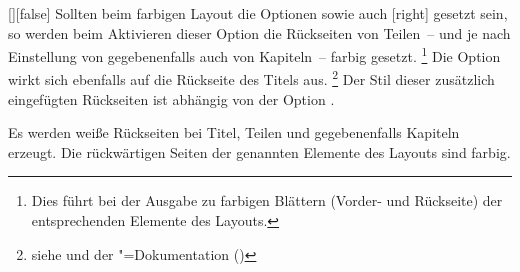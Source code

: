\begin{Declaration}{[\PBoolean]}[false]%
\printdeclarationlist%
%
%
%
%
%
Sollten beim farbigen Layout die Optionen  sowie auch
[right] gesetzt sein, so werden beim Aktivieren dieser Option die 
Rückseiten von Teilen~-- und je nach Einstellung von  
gegebenenfalls auch von Kapiteln~-- farbig gesetzt.%
\footnote{%
  Dies führt bei der Ausgabe zu farbigen Blättern (Vorder- und Rückseite) der 
  entsprechenden Elemente des Layouts.
}
Die Option wirkt sich ebenfalls auf die Rückseite des Titels aus.%
\footnote{%
  siehe  und  der 
  \KOMAScript"=Dokumentation (\scrguide*)
}
Der Stil dieser zusätzlich eingefügten Rückseiten ist abhängig von der Option
.
%
\begin{values}
\itemfalse
  Es werden weiße Rückseiten bei Titel, Teilen und gegebenenfalls Kapiteln 
  erzeugt.
\itemtrue*
  Die rückwärtigen Seiten der genannten Elemente des Layouts sind farbig.
\end{values}
\end{Declaration}

